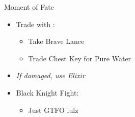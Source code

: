 \begin{battle}{Moment of Fate}
\begin{multicols}{2}
\begin{enumerate}
{\begin{itemize}
        \item Trade with \geoffrey:
        \begin{itemize}
            \item Take Brave Lance
            \item Trade Chest Key for Pure Water
        \end{itemize}
        \item \textit{If damaged, use Elixir}
    \end{itemize}
}
\end{enumerate}
\vspace{3mm}
\begin{itemize}
    \item Black Knight Fight:
    \begin{itemize}
        \item Just GTFO lulz
    \end{itemize}
\end{itemize}
\end{multicols}
\end{battle}
